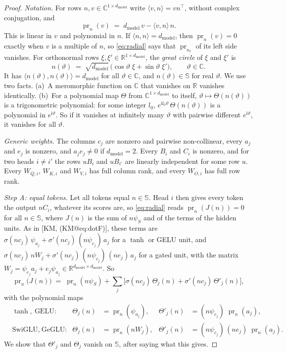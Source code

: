 \documentclass[10pt]{article}
\makeatletter
\theoremstyle{definition}
\theoremstyle{remark}
\newcommand{\R}{\mathbb{R}}
\newcommand{\dm}{d_{\mathrm{model}}}
\newcommand{\KMn}[1]{\csname KM@#1\endcsname}
\newcommand{\KMeq}[1]{[KM, (\KMn{#1})]}
\makeatother
\begin{document}
\begin{proof}
\emph{Notation.} For rows $n, v \in \mathbb C^{1\times\dm}$ write $\langle v, n\rangle = vn^\top$, without complex conjugation, and
\[
\operatorname{pr}_n(v) \;=\; \dm\,v - \langle v, n\rangle\,n .
\]
This is linear in $v$ and polynomial in $n$. If $\langle n, n\rangle = \dm$, then $\operatorname{pr}_n(v) = 0$ exactly when $v$ is a multiple of $n$, so \eqref{eq:radial} says that $\operatorname{pr}_{n_t}$ of its left side vanishes. For orthonormal rows $\xi, \xi' \in \R^{1\times\dm}$, the \emph{great circle} of $\xi$ and $\xi'$ is
\[
n(\vartheta) \;=\; \sqrt{\dm}\,\big(\cos\vartheta\;\xi + \sin\vartheta\;\xi'\big), \qquad \vartheta \in \mathbb C .
\]
It has $\langle n(\vartheta), n(\vartheta)\rangle = \dm$ for all $\vartheta \in \mathbb C$, and $n(\vartheta) \in \mathbb S$ for real $\vartheta$. We use two facts. (a)~A meromorphic function on $\mathbb C$ that vanishes on $\R$ vanishes identically. (b)~For a polynomial map $\Theta$ from $\mathbb C^{1\times\dm}$ to itself, $\vartheta \mapsto \Theta(n(\vartheta))$ is a trigonometric polynomial: for some integer $l_0$, $e^{\mathrm il_0\vartheta}\,\Theta(n(\vartheta))$ is a polynomial in $e^{\mathrm i\vartheta}$. So if it vanishes at infinitely many $\vartheta$ with pairwise different $e^{\mathrm i\vartheta}$, it vanishes for all $\vartheta$.

\emph{Generic weights.} The columns $c_j$ are nonzero and pairwise non-collinear, every $a_j$ and $e_j$ is nonzero, and $a_je_j \neq 0$ if $\dm = 2$. Every $B_i$ and $C_i$ is nonzero, and for two heads $i \neq i'$ the rows $uB_i$ and $uB_{i'}$ are linearly independent for some row $u$. Every $W_{Q,i}$, $W_{K,i}$ and $W_{V,i}$ has full column rank, and every $W_{O,i}$ has full row rank.

\emph{Step A: equal tokens.} Let all tokens equal $n \in \mathbb S$. Head $i$ then gives every token the output $nC_i$, whatever its scores are, so \eqref{eq:radial} reads $\operatorname{pr}_n(J(n)) = 0$ for all $n \in \mathbb S$, where $J(n)$ is the sum of $n\psi_S$ and of the terms of the hidden units. As in \KMeq{eq:dotF}, these terms are $\sigma(nc_j)\,\psi_{a_j} + \sigma'(nc_j)\,(n\psi_{c_j})\,a_j$ for a $\tanh$ or GELU unit, and $\sigma(nc_j)\,nW_j + \sigma'(nc_j)\,(n\psi_{c_j})\,(ne_j)\,a_j$ for a gated unit, with the matrix $W_j = \psi_{e_j}a_j + e_j\psi_{a_j} \in \R^{\dm\times\dm}$. So
\begin{equation}\label{eq:sphereA}
\operatorname{pr}_n\big(J(n)\big) \;=\; \operatorname{pr}_n(n\psi_S) + \sum_j\Big[\sigma(nc_j)\,\Theta_j(n) + \sigma'(nc_j)\,\Theta'_j(n)\Big],
\end{equation}
with the polynomial maps
\begin{align*}
&\tanh,\ \text{GELU:} & \Theta_j(n) &= \operatorname{pr}_n(\psi_{a_j}), & \Theta'_j(n) &= (n\psi_{c_j})\;\operatorname{pr}_n(a_j),\\
&\text{SwiGLU},\ \text{GeGLU:} & \Theta_j(n) &= \operatorname{pr}_n(nW_j), & \Theta'_j(n) &= (n\psi_{c_j})\,(ne_j)\;\operatorname{pr}_n(a_j).
\end{align*}
We show that $\Theta'_j$ and $\Theta_j$ vanish on $\mathbb S$, after saying what this gives.


\end{proof}
\end{document}

